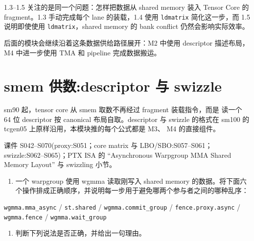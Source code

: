 \documentclass[11pt,a4paper,fontset=fandol]{ctexart}
\providecommand{\tightlist}{\setlength{\itemsep}{0pt}\setlength{\parskip}{0pt}}
\begin{document}
\begin{lookback}

1.3--1.5 关注的是同一个问题：怎样把数据从 shared memory 装入 Tensor Core
的 fragment。1.3 手动完成每个 lane 的装载，1.4 使用 \texttt{ldmatrix}
简化这一步，而 1.5 说明即使使用 \texttt{ldmatrix}，shared memory 的 bank
conflict 仍然会影响实际效率。

后面的模块会继续沿着这条数据供给路径展开：M2 中使用 descriptor
描述布局，M4 中进一步使用 TMA 和 pipeline 完成数据搬运。

\end{lookback}

\section{smem 供数:descriptor 与
swizzle}\label{smem-ux4f9bux6570descriptor-ux4e0e-swizzle}

sm90 起，tensor core 从 smem 取数不再经过 fragment 装载指令，而是 读一个
64 位 descriptor 按 canonical 布局自取。descriptor 与 swizzle 的格式在
sm100 的 tcgen05 上原样沿用，本模块推的每个公式都是 M3、 M4 的直接组件。

\begin{reading}

课件 S042--S070(proxy:S051；core matrix 与 LBO/SBO:S057--S061；
swizzle:S062--S065)；PTX ISA 的 ``Asynchronous Warpgroup MMA Shared
Memory Layout'' 与 swizzling 小节。

\end{reading}


\begin{enumerate}
\def\labelenumi{(\alph{enumi})}
\tightlist
\item
  一个 warpgroup 使用 wgmma 读取刚写入 shared memory
  的数据。将下面六个操作排成正确顺序，并说明每一步用于避免哪两个参与者之间的哪种乱序：
\end{enumerate}

\texttt{wgmma.\allowbreak{}mma\_\allowbreak{}async} /
\texttt{st.\allowbreak{}shared} /
\texttt{wgmma.\allowbreak{}commit\_\allowbreak{}group} /
\texttt{fence.\allowbreak{}proxy.\allowbreak{}async} /
\texttt{wgmma.\allowbreak{}fence} /
\texttt{wgmma.\allowbreak{}wait\_\allowbreak{}group}

\begin{enumerate}
\def\labelenumi{(\alph{enumi})}
\setcounter{enumi}{1}
\tightlist
\item
  判断下列说法是否正确，并给出一句理由。
\end{enumerate}
\end{document}
